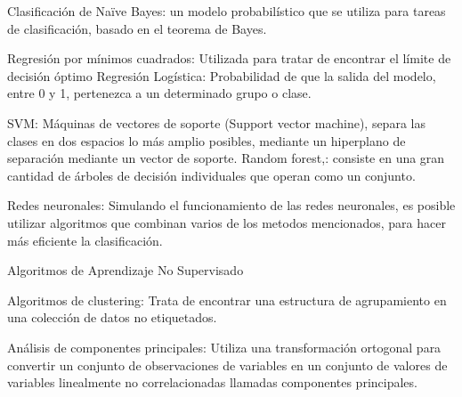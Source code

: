 Clasificación de Naïve Bayes: un modelo probabilístico que se utiliza para tareas de clasificación, basado en el teorema de Bayes.

Regresión por mínimos cuadrados: Utilizada para tratar de encontrar el límite de decisión óptimo
Regresión Logística: Probabilidad de que la salida del modelo, entre 0 y 1, pertenezca a un determinado grupo o clase.

SVM: Máquinas de vectores de soporte (Support vector machine), separa las clases en dos espacios lo más amplio posibles, mediante un hiperplano de separación mediante un vector de soporte.
Random forest,: consiste en una gran cantidad de árboles de decisión individuales que operan como un conjunto.

Redes neuronales: Simulando el funcionamiento de las redes neuronales, es posible utilizar algoritmos que combinan varios de los metodos mencionados, para hacer más eficiente la clasificación.


Algoritmos de Aprendizaje No Supervisado

Algoritmos de clustering: Trata de encontrar una estructura de agrupamiento en una colección de datos no etiquetados.

Análisis de componentes principales: Utiliza una transformación ortogonal para convertir un conjunto de observaciones de variables en un conjunto de valores de variables linealmente no correlacionadas llamadas componentes principales.



